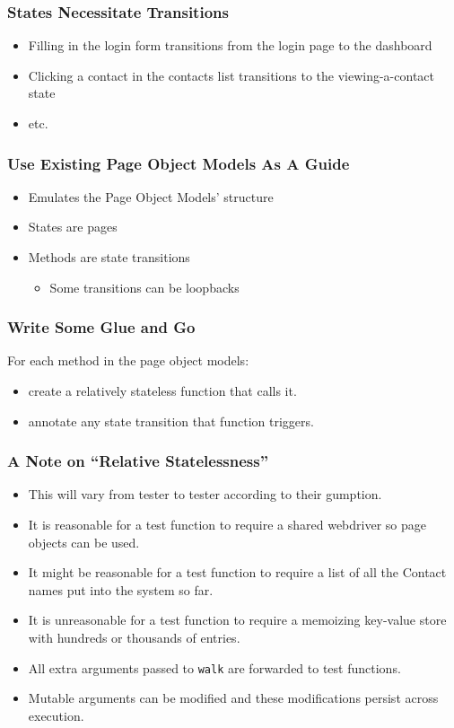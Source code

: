 \begin{frame}
  \frametitle{States Necessitate Transitions}
  \begin{itemize}
    \item Filling in the login form transitions from the login page to the dashboard
    \item Clicking a contact in the contacts list transitions to the viewing-a-contact state
    \item etc.
  \end{itemize}
\end{frame}

\begin{frame}
  \frametitle{Use Existing Page Object Models As A Guide}
  \begin{itemize}
    \item Emulates the Page Object Models' structure
    \item States are pages
    \item Methods are state transitions
    \begin{itemize}
      \item Some transitions can be loopbacks
    \end{itemize}
  \end{itemize}
\end{frame}

\begin{frame}
  \frametitle{Write Some Glue and Go}
  For each method in the page object models:
  \begin{itemize}
    \item create a relatively stateless function that calls it.
    \item annotate any state transition that function triggers.
  \end{itemize}
\end{frame}

\begin{frame}
  \frametitle{A Note on ``Relative Statelessness''}
  \begin{itemize}
    \item This will vary from tester to tester according to their gumption.
    \item It is reasonable for a test function to require a shared webdriver so page objects can be used.
    \item It might be reasonable for a test function to require a list of all the Contact names put into the system so far.
    \item It is unreasonable for a test function to require a memoizing key-value store with hundreds or thousands of entries.
    \item All extra arguments passed to \texttt{walk} are forwarded to test functions.
    \item Mutable arguments can be modified and these modifications persist across execution.
\end{itemize}

\end{frame}

